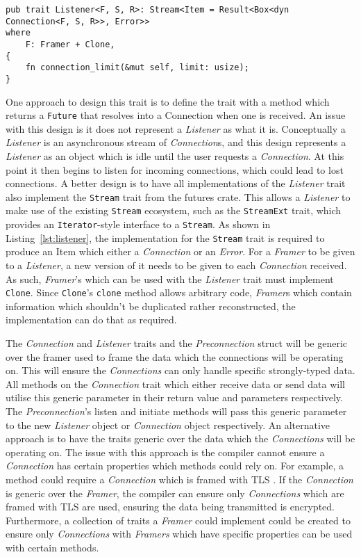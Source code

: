 \begin{lstlisting}[float=h, label=lst:listener, caption={The Listener trait, showing the Stream
implementation requirement for all implementers.}]
pub trait Listener<F, S, R>: Stream<Item = Result<Box<dyn Connection<F, S, R>>, Error>>
where
    F: Framer + Clone,
{
    fn connection_limit(&mut self, limit: usize);
}

\end{lstlisting}
One approach to design this trait is to define the trait with a method which returns a \texttt{Future} that resolves
into a Connection when one is received.
An issue with this design is it does not represent a \emph{Listener} as what it is.
Conceptually a \emph{Listener} is an asynchronous stream of \emph{Connection}s, and this design represents a
\emph{Listener} as an object which is idle until the user requests a \emph{Connection}.
At this point it then begins to listen for incoming connections, which could lead to lost connections.
A better design is to have all implementations of the \emph{Listener} trait also implement the \texttt{Stream} trait
from the futures crate.
This allows a \emph{Listener} to make use of the existing \texttt{Stream} ecosystem, such as the \texttt{StreamExt}
trait, which provides an \texttt{Iterator}-style interface to a \texttt{Stream}.
As shown in Listing~\ref{lst:listener}, the implementation for the \texttt{Stream} trait is required to produce an Item
which either a \emph{Connection} or an \emph{Error}.
For a \emph{Framer} to be given to a \emph{Listener}, a new version of it needs to be given to each \emph{Connection}
received.
As such, \emph{Framer}'s which can be used with the \emph{Listener} trait must implement \texttt{Clone}.
Since \texttt{Clone}'s \texttt{clone} method allows arbitrary code, \emph{Framer}s which contain information which
shouldn't be duplicated rather reconstructed, the implementation can do that as required.

The \emph{Connection} and \emph{Listener} traits and the \emph{Preconnection} struct will be generic over the framer
used to frame the data which the connections will be operating on.
This will ensure the \emph{Connections} can only handle specific strongly-typed data.
All methods on the \emph{Connection} trait which either receive data or send data will utilise this generic parameter in
their return value and parameters respectively.
The \emph{Preconnection}'s listen and initiate methods will pass this generic parameter to the new \emph{Listener}
object or \emph{Connection} object respectively.
An alternative approach is to have the traits generic over the data which the \emph{Connections} will be operating on.
The issue with this approach is the compiler cannot ensure a \emph{Connection} has certain properties which methods
could rely on.
For example, a method could require a \emph{Connection} which is framed with TLS .
If the \emph{Connection} is generic over the \emph{Framer}, the compiler can ensure only \emph{Connections} which are
framed with TLS are used, ensuring the data being transmitted is encrypted.
Furthermore, a collection of traits a \emph{Framer} could implement could be created to ensure only \emph{Connections}
with \emph{Framers} which have specific properties can be used with certain methods.

